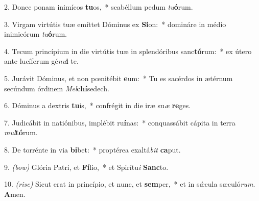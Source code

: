 2. Donec ponam inimícos \textbf{tu}os,~* scabéllum pedum \textit{tu}\textbf{ó}rum.

3. Virgam virtútis tuæ emíttet Dóminus ex \textbf{Si}on:~* domináre in médio inimicórum \textit{tu}\textbf{ó}rum.

4. Tecum princípium in die virtútis tuæ in splendóribus sanc\textbf{tó}rum:~* ex útero ante lucíferum gé\textit{nu}\textbf{i} te.

5. Jurávit Dóminus, et non p{\oe}nitébit \textbf{e}um:~* Tu es sacérdos in ætérnum secúndum órdinem \textit{Mel}\textbf{chí}sedech.

6. Dóminus a dextris \textbf{tu}is,~* confrégit in die iræ su\textit{æ} \textbf{re}ges.

7. Judicábit in natiónibus, implébit ru\textbf{í}nas:~* conquassábit cápita in terra \textit{mul}\textbf{tó}rum.

8. De torrénte in via \textbf{bi}bet:~* proptérea exaltá\textit{bit} \textbf{ca}put.

9. \textit{(bow)} Glória Patri, et \textbf{Fí}lio,~* et Spirítu\textit{i} \textbf{Sanc}to.

10. \textit{(rise)} Sicut erat in princípio, et nunc, et \textbf{sem}per,~* et in s\'{\ae}cula sæculó\textit{rum}. \textbf{A}men.
